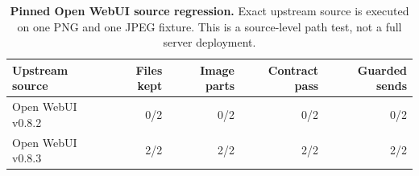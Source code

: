 \begin{table}[H]
\centering
\scriptsize
\setlength{\tabcolsep}{2.4pt}
\caption{\textbf{Pinned Open WebUI source regression.} Exact upstream source is executed on one PNG and one JPEG fixture. This is a source-level path test, not a full server deployment.}
\label{tab:open-webui-source-regression}
\begin{tabular}{@{}lrrrr@{}}
\toprule
Upstream source & Files kept & Image parts & Contract pass & Guarded sends \\
\midrule
Open WebUI v0.8.2 & 0/2 & 0/2 & 0/2 & 0/2 \\
Open WebUI v0.8.3 & 2/2 & 2/2 & 2/2 & 2/2 \\
\bottomrule
\end{tabular}
\end{table}
